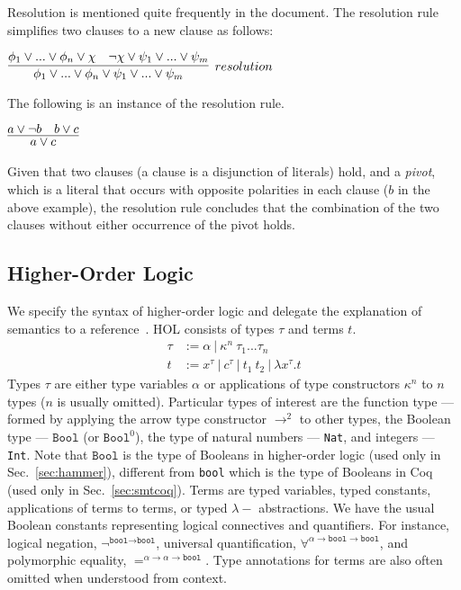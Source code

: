 \documentclass{article}
\begin{document}
	Resolution is mentioned quite 
	frequently in the document. The resolution 
	rule simplifies two clauses 
	to a new clause as follows:
	\begin{center}
		$\infer[resolution]{\phi_1 \lor ... \lor 
			\phi_n \lor \psi_1 \lor ... \lor 
			\psi_m}{\phi_1 \lor ... \lor \phi_n 
			\lor \chi & \neg \chi \lor \psi_1 
			\lor ... \lor \psi_m}$ 
	\end{center}
	The following is an instance of the 
	resolution rule.
	\begin{center}
		$\infer{a \lor c}{a \lor \neg b 
			& b \lor c}$
	\end{center}
	Given that two clauses (a clause 
	is a disjunction of literals) hold, 
	and a \textit{pivot}, which is a 
	literal that occurs with opposite 
	polarities in each clause ($b$ in 
	the above example), the resolution 
	rule concludes that 
	the combination of the two clauses 
	without either occurrence of the 
	pivot holds.
	
	\subsection{Higher-Order Logic}
	\label{sec:hol}
	We specify the 
	syntax of higher-order logic 
	and delegate the explanation of 
	semantics to a 
	reference~\cite{10.5555/155278}. 
	HOL consists of 
	types $\tau$ and terms $t$. 
	\begin{align*}
	\tau &:= \alpha\ |\ \kappa^n\ 
	\tau_1 ... \tau_n\\
	t &:= x^{\tau}\ |\ c^{\tau}\ |\ t_1\ t_2\ 
	|\ \lambda x^{\tau}.t
	\end{align*}	
	Types $\tau$ are either type
	variables $\alpha$ or 
	applications of type 
	constructors $\kappa^n$ to 
	$n$ types ($n$ is usually omitted). 
	Particular types of interest are 
	the function type --- formed by 
	applying the arrow type constructor 
	$\to^{2}$ to other types, the 
	Boolean type --- $\texttt{Bool}$ 
	(or $\texttt{Bool}^0$), the type of 
	natural numbers --- \texttt{Nat},
	and integers --- \texttt{Int}.
	Note that $\texttt{Bool}$ is the 
	type of Booleans in higher-order
	logic (used only in 
	Sec.~\ref{sec:hammer}), different
	from \texttt{bool} which is the 
	type of Booleans in Coq (used only 
	in Sec.~\ref{sec:smtcoq}).
	Terms are typed variables, 
	typed constants, applications 
	of terms to terms, or typed
	$\lambda-$ abstractions. We have
	the usual Boolean constants 
	representing logical connectives
	and quantifiers. For instance, 
	logical negation, 
	$\neg^{\texttt{bool} \to 
		\texttt{bool}}$, universal 
	quantification,
	$\forall^{\alpha \to 
		\texttt{bool} \to \texttt{bool}}$, 
	and polymorphic equality,
	$=^{\alpha \to \alpha 
		\to \texttt{bool}}$. Type 
	annotations for terms are also 
	often omitted when understood
	from context.
	
\end{document}
